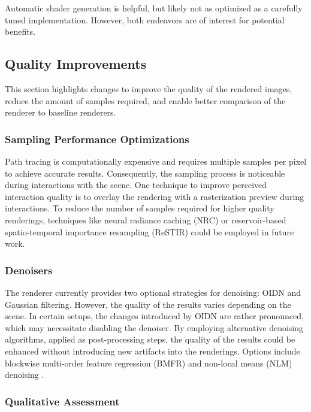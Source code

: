 Automatic shader generation is helpful, but likely not as optimized as a carefully tuned implementation. However, both endeavors are of interest for potential benefits.

\subsection*{Quality Improvements}

This section highlights changes to improve the quality of the rendered images, reduce the amount of samples required, and enable better comparison of the renderer to baseline renderers.

\subsubsection*{Sampling Performance Optimizations}

Path tracing is computationally expensive and requires multiple samples per pixel to achieve accurate results. Consequently, the sampling process is noticeable during interactions with the scene. One technique to improve perceived interaction quality is to overlay the rendering with a rasterization preview during interactions. To reduce the number of samples required for higher quality renderings, techniques like neural radiance caching (NRC) \cite{muller2021real} or reservoir-based spatio-temporal importance resampling (ReSTIR) \cite{restir} could be employed in future work.

\subsubsection*{Denoisers}

The renderer currently provides two optional strategies for denoising: \gls{OIDN} \cite{openImageDenoise} and Gaussian filtering. However, the quality of the results varies depending on the scene. In certain setups, the changes introduced by \gls{OIDN} are rather pronounced, which may necessitate disabling the denoiser. By employing alternative denoising algorithms, applied as post-processing steps, the quality of the results could be enhanced without introducing new artifacts into the renderings. Options include blockwise multi-order feature regression (BMFR) \cite{blockwise-multi-order-regresssion-for-rt-pt} and non-local means (NLM) denoising \cite{buadesNLMDenoising}.

\subsubsection*{Qualitative Assessment}

